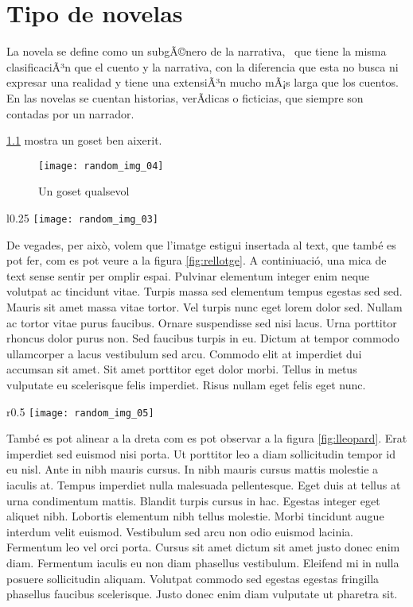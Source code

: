 \chapter{Tipo de novelas}
\label{cap:primer}La novela se define como un subgÃ©nero de la narrativa,  que tiene la misma clasificaciÃ³n que el cuento y la narrativa, con la diferencia que esta no busca ni expresar una realidad y tiene una extensiÃ³n mucho mÃ¡s larga que los cuentos. En las novelas se cuentan historias, verÃ­dicas o ficticias, que siempre son contadas por un narrador.

 \ref{fig:gos} mostra un goset ben aixerit.
\begin{figure}[h]
    \centering
    \texttt{[image: random\_img\_04]}
    \caption{Un goset qualsevol}
    \label{fig:gos}
\end{figure}

\begin{wrapfigure}{l}{0.25\textwidth}
    \centering
    \texttt{[image: random\_img\_03]}
    \caption{El temps vola}
    \label{fig:rellotge}
\end{wrapfigure}

De vegades, per això, volem que l'imatge estigui insertada al text, que també es pot fer, com es pot veure a la figura \ref{fig:rellotge}. A continiuació, una mica de text sense sentir per omplir espai. Pulvinar elementum integer enim neque volutpat ac tincidunt vitae. Turpis massa sed elementum tempus egestas sed sed. Mauris sit amet massa vitae tortor. Vel turpis nunc eget lorem dolor sed. Nullam ac tortor vitae purus faucibus. Ornare suspendisse sed nisi lacus. Urna porttitor rhoncus dolor purus non. Sed faucibus turpis in eu. Dictum at tempor commodo ullamcorper a lacus vestibulum sed arcu. Commodo elit at imperdiet dui accumsan sit amet. Sit amet porttitor eget dolor morbi. Tellus in metus vulputate eu scelerisque felis imperdiet. Risus nullam eget felis eget nunc.

\begin{wrapfigure}{r}{0.5\textwidth}
    \centering
    \texttt{[image: random\_img\_05]}
    \caption{El lleopard}
    \label{fig:lleopard}
\end{wrapfigure}
També es pot alinear a la dreta com es pot observar a la figura \ref{fig:lleopard}. Erat imperdiet sed euismod nisi porta. Ut porttitor leo a diam sollicitudin tempor id eu nisl. Ante in nibh mauris cursus. In nibh mauris cursus mattis molestie a iaculis at. Tempus imperdiet nulla malesuada pellentesque. Eget duis at tellus at urna condimentum mattis. Blandit turpis cursus in hac. Egestas integer eget aliquet nibh. Lobortis elementum nibh tellus molestie. Morbi tincidunt augue interdum velit euismod. Vestibulum sed arcu non odio euismod lacinia. Fermentum leo vel orci porta. Cursus sit amet dictum sit amet justo donec enim diam. Fermentum iaculis eu non diam phasellus vestibulum. Eleifend mi in nulla posuere sollicitudin aliquam. Volutpat commodo sed egestas egestas fringilla phasellus faucibus scelerisque. Justo donec enim diam vulputate ut pharetra sit.

